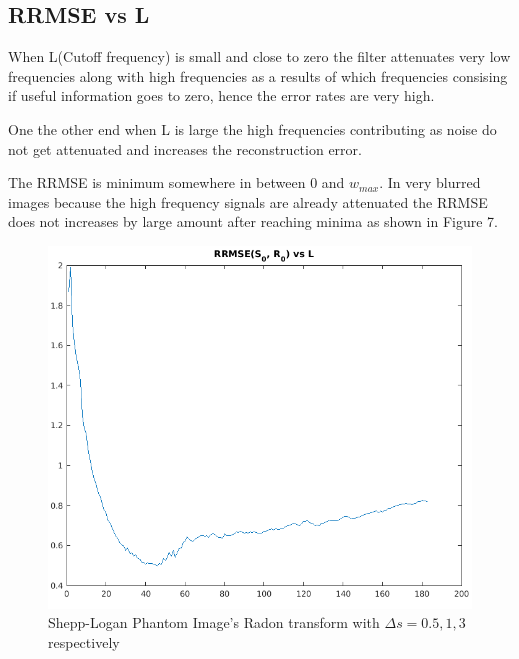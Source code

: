 \documentclass[11pt]{article}
\begin{document}
\FloatBarrier
\subsection{RRMSE vs L}
When L(Cutoff frequency) is small and close to zero the filter attenuates very low frequencies along with high frequencies as a results of which frequencies consising if useful information goes to zero, hence the error rates are very high.

One the other end when L is large the high frequencies contributing as noise do not get attenuated and increases the reconstruction error.

The RRMSE is minimum somewhere in between $0$ and $w_{max}$. In very blurred images because the high frequency signals are already attenuated the RRMSE does not increases by large amount after reaching minima as shown in Figure 7.
\begin{figure}[!h]
\centering
\includegraphics[scale=0.45]{RRMSE0}
\caption{Shepp-Logan Phantom Image's Radon transform with $\Delta s = 0.5,1,3$ respectively}
\end{figure}
\end{document}
